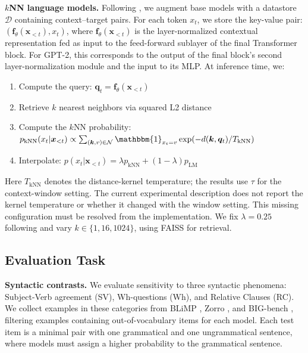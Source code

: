 \noindent \textbf{$k$NN language models.} Following \citet{khandelwal2020knnlm}, we augment base models with a datastore $\mathcal{D}$ containing context--target pairs. For each token $x_t$, we store the key-value pair: $(\bm{f}_\theta(\bm{x}_{<t}), x_t)$, where $\bm{f}_\theta(\bm{x}_{<t})$ is the layer-normalized contextual
representation fed as input to the feed-forward sublayer of the final Transformer block. For GPT-2, this corresponds to the output of the final block's second layer-normalization module and the input to its MLP. At inference time, we:
\vspace{-0.2cm}
\begin{enumerate}[itemsep=0.1pt, parsep=0pt]
    \item Compute the query: $\bm{q}_t = \bm{f}_\theta(\bm{x}_{<t})$
    \item Retrieve $k$ nearest neighbors via squared L2 distance
    \item Compute the $k$NN probability: $p_{\text{kNN}}(x_t|\bm{x}_{<t}) \propto \sum_{(\bm{k},v) \in \mathcal{N}} \mathbbm{1}_{x_t=v} \exp(-d(\bm{k},\bm{q}_t)/T_{\mathrm{kNN}})$
    \item Interpolate: $p(x_t|\bm{x}_{<t}) = \lambda p_{\text{kNN}} + (1-\lambda) p_{\text{LM}}$
\end{enumerate}

\noindent Here $T_{\mathrm{kNN}}$ denotes the distance-kernel temperature; the results use $\tau$ for the context-window setting. The current experimental description does not report the kernel temperature or whether it changed with the window setting. This missing configuration must be resolved from the implementation. We fix $\lambda=0.25$ following \citet{khandelwal2020knnlm} and vary $k \in \{1, 16, 1024\}$, using FAISS \citep{johnson2019billion} for retrieval.



\subsection{Evaluation Task}

\textbf{Syntactic contrasts.} We evaluate sensitivity to three syntactic phenomena: Subject-Verb agreement (SV), Wh-questions (Wh), and Relative Clauses (RC). We collect examples in these categories from BLiMP \citep{warstadt2020blimp}, Zorro \citep{huebner2021babyberta}, and BIG-bench \citep{srivastava2023beyond}, filtering examples containing out-of-vocabulary items for each model. Each test item is a minimal pair with one grammatical and one ungrammatical sentence, where models must assign a higher probability to the grammatical sentence. 


